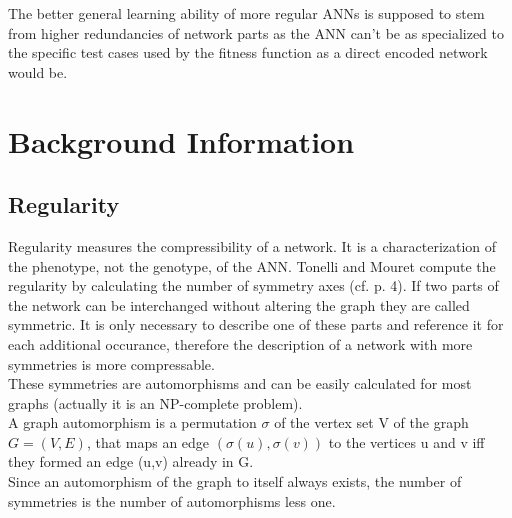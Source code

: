 \documentclass[12pt,twoside]{article}
\theoremstyle{plain}
\theoremstyle{definition}
\theoremstyle{remark}
\begin{document}
The better general learning ability of more regular ANNs is supposed to stem from higher redundancies of network parts as the ANN can't be as specialized to the specific test cases used by the fitness function as a direct encoded network would be.


\section{Background Information}
\label{sec:background}
\subsection{Regularity}
Regularity measures the compressibility of a network. It is a characterization of the phenotype, not the genotype, of the ANN.
Tonelli and Mouret compute the regularity by calculating the number of symmetry axes (cf. \cite{citeulike:12788284} p. 4).
If two parts of the network can be interchanged without altering the graph they are called symmetric.
It is only necessary to describe one of these parts and reference it for each additional occurance, therefore the description of a network with more symmetries is more compressable.\\
These symmetries are automorphisms and can be easily calculated for most graphs (actually it is an NP-complete problem).\\
A graph automorphism is a permutation $\sigma$ of the vertex set V of the graph $G = (V,E)$, that maps an edge $(\sigma(u),\sigma(v))$ to the vertices u and v iff they formed an edge (u,v) already in G.\\
Since an automorphism of the graph to itself always exists, the number of symmetries is the number of automorphisms less one.
\end{document}

